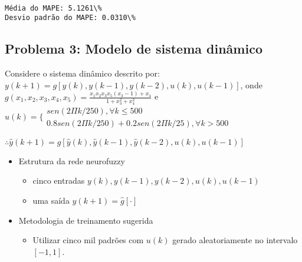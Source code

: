 \documentclass[11pt]{article}
\providecommand{\tightlist}{%
      \setlength{\itemsep}{0pt}\setlength{\parskip}{0pt}}
\begin{document}
    \begin{center}
    \end{center}
    { \hspace*{\fill} \\}
    
    \begin{Verbatim}[commandchars=\\\{\}]
Média do MAPE: 5.1261\%
Desvio padrão do MAPE: 0.0310\%
    \end{Verbatim}

    \hypertarget{problema-3-modelo-de-sistema-dinuxe2mico}{%
\subsection{Problema 3: Modelo de sistema
dinâmico}\label{problema-3-modelo-de-sistema-dinuxe2mico}}

Considere o sistema dinâmico descrito por:
\(y(k+1) = g[y(k), y(k-1), y(k-2), u(k), u(k-1)]\), onde
\(g(x_{1}, x_{2}, x_{3}, x_{4}, x_{5}) = \frac{x_{1}x_{2}x_{3}x_{5}(x_{3}-1)+x_{4}}{1+x_{3}^2+x_{4}^2}\)
e
\(u(k) = \{\begin{array}{ll}sen(2\Pi k/250), \forall k \leq 500 \\0.8sen(2\Pi k/250) + 0.2sen(2\Pi k/25), \forall k > 500 \end{array}\)

\(\therefore \hat{y}(k+1) = \hat{g}[\hat{y}(k), \hat{y}(k-1), \hat{y}(k-2), u(k), u(k-1)]\)

\begin{itemize}
\tightlist
\item
  Estrutura da rede neurofuzzy

  \begin{itemize}
  \tightlist
  \item
    cinco entradas \(y(k), y(k-1), y(k-2), u(k), u(k-1)\)
  \item
    uma saída \(y(k+1) = \hat{g}[\cdot ]\)
  \end{itemize}
\item
  Metodologia de treinamento sugerida

  \begin{itemize}
  \tightlist
  \item
    Utilizar cinco mil padrões com \(u(k)\) gerado aleatoriamente no
    intervalo \([-1,1]\).
  \end{itemize}
\end{itemize}
\end{document}
